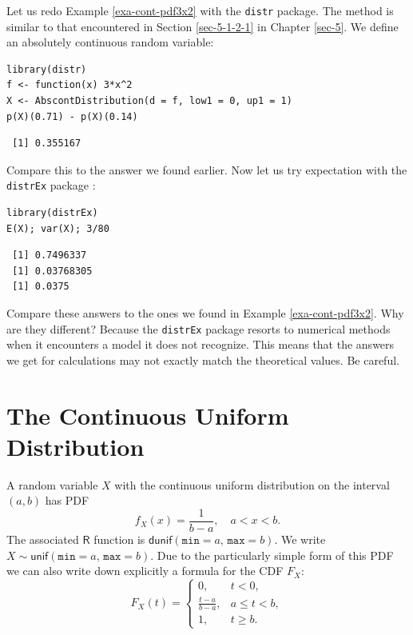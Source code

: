 \documentclass[captions=tableheading]{scrbook}
\begin{document}
\begin{example}
Let us redo Example \ref{exa-cont-pdf3x2} with the \texttt{distr} package. The method is similar to that encountered in Section \ref{sec-5-1-2-1} in Chapter \ref{sec-5}. We define an absolutely continuous random variable:



\lstset{language=R}
\begin{lstlisting}
library(distr)
f <- function(x) 3*x^2
X <- AbscontDistribution(d = f, low1 = 0, up1 = 1)
p(X)(0.71) - p(X)(0.14)
\end{lstlisting}

\begin{verbatim}
 [1] 0.355167
\end{verbatim}

Compare this to the answer we found earlier. Now let us try expectation with the \texttt{distrEx} package \cite{Ruckdescheldistr}:

\lstset{language=R}
\begin{lstlisting}
library(distrEx)
E(X); var(X); 3/80
\end{lstlisting}

\begin{verbatim}
 [1] 0.7496337
 [1] 0.03768305
 [1] 0.0375
\end{verbatim}

Compare these answers to the ones we found in Example \ref{exa-cont-pdf3x2}. Why are they different? Because the \texttt{distrEx} package resorts to numerical methods when it encounters a model it does not recognize. This means that the answers we get for calculations may not exactly match the theoretical values. Be careful.
\end{example}
\section{The Continuous Uniform Distribution}
\label{sec-6-2}
\label{sec-The-Continuous-Uniform}


A random variable \(X\) with the continuous uniform distribution on the interval \((a,b)\) has PDF
\begin{equation}
f_{X}(x)=\frac{1}{b-a}, \quad a < x < b.
\end{equation}
The associated \(\mathsf{R}\) function is \(\mathsf{dunif}(\mathtt{min}=a,\,\mathtt{max}=b)\). We write \(X\sim\mathsf{unif}(\mathtt{min}=a,\,\mathtt{max}=b)\). Due to the particularly simple form of this PDF we can also write down explicitly a formula for the CDF \(F_{X}\):
\begin{equation}
F_{X}(t)=
\begin{cases}
0, & t < 0,\\
\frac{t-a}{b-a}, & a\leq t < b,\\
1, & t \geq b.
\end{cases}
\label{eq-unif-cdf}
\end{equation}
\end{document}
